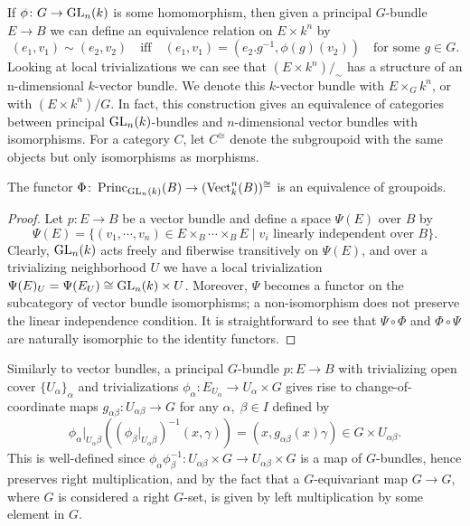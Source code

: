 \documentclass[a4paper,openany]{scrbook}
\DeclareMathOperator{\Vect}{Vect}
\DeclareMathOperator{\Princ}{Princ}
\begin{document}
If $\phi\colon G \to \operatorname{GL}_n(k)$ is some homomorphism, then given a principal $G$-bundle $E \to B$ we can define an equivalence relation on $E \times k^n$ by
\[
  (e_1,v_1) \sim (e_2,v_2) \quad \text{iff} \quad (e_1, v_1) = (e_2.g^{-1},\phi(g)(v_2)) \quad \text{for some }g \in G.
\] 
Looking at local trivializations we can see that $(E\times k^n)/_{\sim}$ has a structure of an n-dimensional $k$-vector bundle. We denote this $k$-vector bundle with $E \times_G k^n$, or with $(E \times k^n)/G$. In fact, this construction gives an equivalence of categories between principal $\operatorname{GL}_n(k)$-bundles and $n$-dimensional vector bundles with isomorphisms. For a category $C$, let $C^{\cong}$ denote the subgroupoid with the same objects but only isomorphisms as morphisms. 

\begin{prop}
The functor $\Phi\colon \Princ_{\GL_n(k)}(B) \to (\Vect^n_k(B))^{\cong}$ is an equivalence of groupoids.
\end{prop}
\begin{proof}
Let $p\colon E \to B$ be a vector bundle and define a space $\Psi(E)$ over $B$ by
\[
\Psi(E) = \{(v_1,\cdots,v_n) \in E \times_B \cdots \times_B E \mid v_i \text{ linearly independent over $B$}\}.
\]
Clearly, $\operatorname{GL}_n(k)$ acts freely and fiberwise transitively on $\Psi(E)$, and over a trivializing neighborhood $U$ we have a local trivialization $\Psi(E)_U = \Psi(E_U) \cong \operatorname{GL}_n(k) \times U$. Moreover, $\Psi$ becomes a functor on the subcategory of vector bundle isomorphisms; a non-isomorphism does not preserve the linear independence condition. It is straightforward to see that $\Psi\circ\Phi$ and $\Phi\circ\Psi$ are naturally isomorphic to the identity functors.
\end{proof}

Similarly to vector bundles, a principal $G$-bundle $p\colon E \to B$ with trivializing open cover $\{U_\alpha\}_{\alpha}$ and trivializations $\phi_\alpha\colon E_{U_{\alpha}} \to U_{\alpha} \times G $ gives rise to change-of-coordinate maps $g_{\alpha\beta}\colon U_{\alpha\beta} \to G$ for any $\alpha,\;\beta \in I$ defined by
\[
\phi_\alpha|_{U_\alpha\beta}\left((\phi_\beta|_{U_\alpha\beta})^{-1}(x,\gamma)\right) = (x,g_{\alpha\beta}(x)\gamma) \in G \times U_{\alpha\beta}.
\]
This is well-defined since $\phi_\alpha\phi_\beta^{-1}\colon U_{\alpha \beta} \times G \to U_{\alpha \beta} \times G$ is a map of $G$-bundles, hence preserves right multiplication, and by the fact that a $G$-equivariant map $G \to G$, where $G$ is considered a right $G$-set, is given by left multiplication by some element in $G$.
\end{document}
